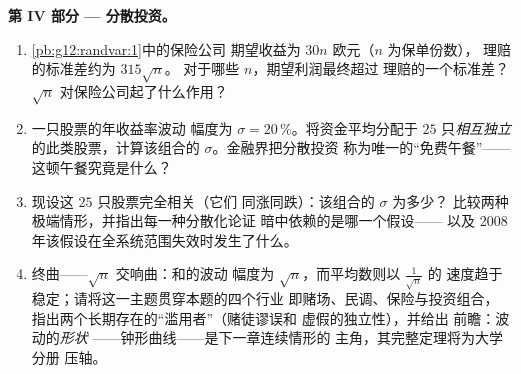 \begin{problem}
\medskip
\noindent\textbf{第 IV 部分 --- 分散投资。}
\begin{enumerate}[resume]
  \item \cref{pb:g12:randvar:1}中的保险公司
        期望收益为 $30n$ 欧元（$n$ 为保单份数），
        理赔的标准差约为 $315\sqrt n$。
        对于哪些 $n$，期望利润最终超过
        理赔的一个标准差？
        $\sqrt n$ 对保险公司起了什么作用？
  \item 一只股票的年收益率波动
        幅度为 $\sigma = 20\,\%$。将资金平均分配于 $25$
        只\emph{相互独立}的此类股票，计算该组合的
        $\sigma$。金融界把分散投资
        称为唯一的“免费午餐”——这顿午餐究竟是什么？
  \item 现设这 $25$ 只股票完全相关（它们
        同涨同跌）：该组合的 $\sigma$ 为多少？
        比较两种极端情形，并指出每一种分散化论证
        暗中依赖的是哪一个假设——
        以及 2008 年该假设在全系统范围失效时发生了什么。
  \item 终曲——$\sqrt n$ 交响曲：和的波动
        幅度为 $\sqrt n$，而平均数则以 $\frac{1}{\sqrt n}$ 的
        速度趋于稳定；请将这一主题贯穿本题的四个行业
        即赌场、民调、保险与投资组合，
        指出两个长期存在的“滥用者”（赌徒谬误和
        虚假的独立性），并给出
        前瞻：波动的\emph{形状}
        ——钟形曲线——是下一章连续情形的
        主角，其完整定理将为大学分册
        压轴。
\end{enumerate}
\end{problem}
